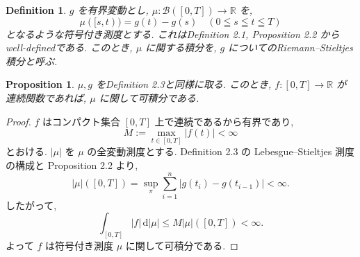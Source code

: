 \documentclass[11pt]{article}
\theoremstyle{breakstyle}
\newtheorem{proposition}[theorem]{Proposition}
\newtheorem{definition}[theorem]{Definition}
\begin{document}
\begin{definition}
    $g$ を有界変動とし, $\mu : \mathcal{B}([0,T])\rightarrow \mathbb{R}$ を, 
    \begin{equation*}
        \mu([s,t))=g(t)-g(s)\quad (0\leqq s\leqq t\leqq T)
    \end{equation*}
    となるような符号付き測度とする. これはDefinition 2.1, Proposition 2.2 からwell-definedである.
    このとき, $\mu$ に関する積分を, $g$ についてのRiemann–Stieltjes積分と呼ぶ.
\end{definition}
\begin{proposition}
    $\mu, g$ をDefinition 2.3と同様に取る. このとき, $f:[0,T]\rightarrow\mathbb{R}$ が連続関数であれば, $\mu$ に関して可積分である.
\end{proposition}
\begin{proof}
    $f$ はコンパクト集合 $[0,T]$ 上で連続であるから有界であり,
    \begin{equation*}
        M:=\max_{t\in[0,T]}|f(t)|<\infty
    \end{equation*}
    とおける. $|\mu|$ を $\mu$ の全変動測度とする. Definition 2.3 の
    Lebesgue--Stieltjes 測度の構成と Proposition 2.2 より,
    \begin{equation*}
        |\mu|([0,T])
        =\sup_{\pi}\sum_{i=1}^n |g(t_i)-g(t_{i-1})|
        <\infty.
    \end{equation*}
    したがって,
    \begin{equation*}
        \int_{[0,T]} |f|\,\mathrm{d}|\mu|
        \leq M|\mu|([0,T])<\infty.
    \end{equation*}
    よって $f$ は符号付き測度 $\mu$ に関して可積分である.
\end{proof}
\end{document}
